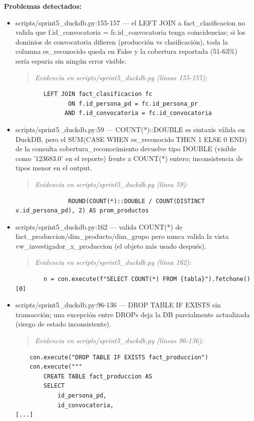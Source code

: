 \begin{tcolorbox}[riesgo]
\textbf{Problemas detectados:}
\begin{itemize}
  \item scripts/sprint5\_duckdb.py:155-157 --- el LEFT JOIN a fact\_clasificacion no valida que f.id\_convocatoria = fc.id\_convocatoria tenga coincidencias; si los dominios de convocatoria difieren (producción vs clasificación), toda la columna es\_reconocido queda en False y la cobertura reportada (51-63\%) sería espuria sin ningún error visible.
\begin{quote}\footnotesize\ttfamily
\noindent\emph{Evidencia en scripts/sprint5\_duckdb.py (líneas 155-157):}
\end{quote}
\begin{lstlisting}
        LEFT JOIN fact_clasificacion fc
               ON f.id_persona_pd = fc.id_persona_pr
              AND f.id_convocatoria = fc.id_convocatoria
\end{lstlisting}

  \item scripts/sprint5\_duckdb.py:59 --- COUNT(*)::DOUBLE es sintaxis válida en DuckDB, pero el SUM(CASE WHEN es\_reconocido THEN 1 ELSE 0 END) de la consulta cobertura\_reconocimiento devuelve tipo DOUBLE (visible como '123683.0' en el reporte) frente a COUNT(*) entero; inconsistencia de tipos menor en el output.
\begin{quote}\footnotesize\ttfamily
\noindent\emph{Evidencia en scripts/sprint5\_duckdb.py (línea 59):}
\end{quote}
\begin{lstlisting}
               ROUND(COUNT(*)::DOUBLE / COUNT(DISTINCT v.id_persona_pd), 2) AS prom_productos
\end{lstlisting}

  \item scripts/sprint5\_duckdb.py:162 --- valida COUNT(*) de fact\_produccion/dim\_producto/dim\_grupo pero nunca valida la vista vw\_investigador\_x\_produccion (el objeto más usado después).
\begin{quote}\footnotesize\ttfamily
\noindent\emph{Evidencia en scripts/sprint5\_duckdb.py (línea 162):}
\end{quote}
\begin{lstlisting}
        n = con.execute(f"SELECT COUNT(*) FROM {tabla}").fetchone()[0]
\end{lstlisting}

  \item scripts/sprint5\_duckdb.py:96-136 --- DROP TABLE IF EXISTS sin transacción; una excepción entre DROPs deja la DB parcialmente actualizada (riesgo de estado inconsistente).
\begin{quote}\footnotesize\ttfamily
\noindent\emph{Evidencia en scripts/sprint5\_duckdb.py (líneas 96-136):}
\end{quote}
\begin{lstlisting}
    con.execute("DROP TABLE IF EXISTS fact_produccion")
    con.execute("""
        CREATE TABLE fact_produccion AS
        SELECT
            id_persona_pd,
            id_convocatoria,
[...]
\end{lstlisting}


\end{itemize}
\end{tcolorbox}
